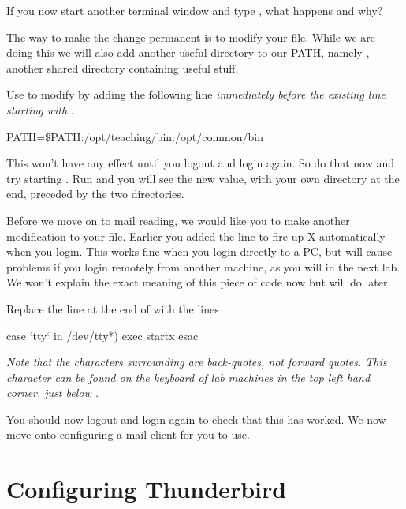 If you now start another terminal window and type , what happens and why?

The way to make the change permanent is to modify your
 file. While we are doing this we will also add
another useful directory to our PATH, namely ,
another shared directory containing useful stuff.

Use  to modify   by adding the following line \emph{immediately before the existing line starting with }.

\begin{ttoutenv}
PATH=\$PATH:/opt/teaching/bin:/opt/common/bin
\end{ttoutenv}


This won't have any effect until you logout and login again. So do that now and try starting . Run  and you will see the new value, with your own  directory at the end, preceded by the two  directories.

Before we move on to mail reading, we would like you to make another modification to your  file. Earlier you added the line  to fire up X automatically when you login. This works fine when you login directly to a PC, but will cause problems if you login remotely from another machine, as you will in the next lab. We won't explain the exact meaning of this piece of code now but will do later.

Replace the line  at the end of  with the lines

\begin{ttoutenv}
case `tty` in
/dev/tty*) exec startx
esac 
\end{ttoutenv}

\emph{Note that the characters surrounding  are back-quotes, not forward quotes. This character can be found on the keyboard of lab machines in the top left hand corner, just below .}

You should now logout and login again to check that this has worked. We now move onto configuring a mail client for you to use.

\section{Configuring Thunderbird}


